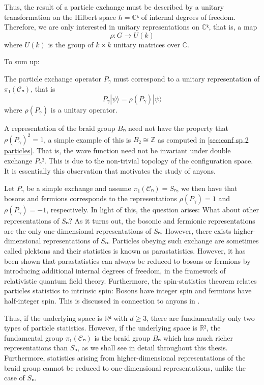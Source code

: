 Thus, the result of a particle exchange must be described by a unitary transformation on the Hilbert space $h = ℂᵏ$ of internal degrees of freedom. Therefore, we are only interested in unitary representations on $ℂᵏ$, that is, a map
\begin{equation}
  ρ : G → U(k)
\end{equation}
where $U(k)$ is the group of $k×k$ unitary matrices over $ℂ$.

To sum up:
\begin{lemma}
  The particle exchange operator $P_γ$ must correspond to a unitary representation of $π₁(𝒞ₙ)$, that is
  \begin{equation}
    P_γ |ψ⟩ = ρ(P_γ) |ψ⟩
  \end{equation}
  where $ρ(P_γ)$ is a unitary operator.
\end{lemma}

A representation of the braid group $Bₙ$ need not have the property that $ρ(P_γ)^2 = 1$, a simple example of this is $B₂ ≅ ℤ$ as computed in \cref{sec:conf sp 2 particles}. That is, the wave function need not be invariant under double exchange $P_γ²$. This is due to the non-trivial topology of the configuration space. It is essentially this observation that motivates the study of anyons.

\begin{remark}
  Let $P_γ$ be a simple exchange and assume $π₁(𝒞ₙ) = Sₙ$, we then have that bosons and fermions corresponds to the representations $ρ(P_γ) = 1$ and $ρ(P_γ) = -1$, respectively. In light of this, the question arises: What about other representations of $Sₙ$? As it turns out, the bosonic and fermionic representations are the only one-dimensional representations of $Sₙ$. However, there exists higher-dimensional representations of $Sₙ$. Particles obeying such exchange are sometimes called plektons and their statistics is known as parastatistics. However, it has been shown that parastatistics can always be reduced to bosons or fermions by introducing additional internal degrees of freedom, in the framework of relativistic quantum field theory. \cite{fröhlich,doplicher} Furthermore, the spin-statistics theorem relates particles statistics to intrinsic spin: Bosons have integer spin and fermions have half-integer spin. This is discussed in connection to anyons in \cite{nonperturbative}.
\end{remark}

Thus, if the underlying space is $ℝᵈ$ with $d ≥ 3$, there are fundamentally only two types of particle statistics. However, if the underlying space is $ℝ²$, the fundamental group $π₁(𝒞ₙ)$ is the braid group $Bₙ$ which has much richer representations than $Sₙ$, as we shall see in detail throughout this thesis. Furthermore, statistics arising from higher-dimensional representations of the braid group cannot be reduced to one-dimensional representations, unlike the case of $Sₙ$. \cite{fröhlich}

